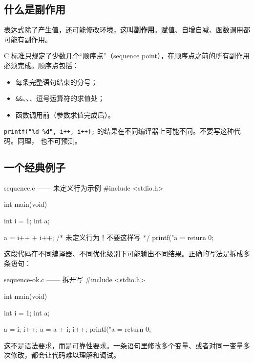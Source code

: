 \subsection{什么是副作用}

表达式除了产生值，还可能修改环境，这叫\textbf{副作用}。赋值、自增自减、函数调用都可能有副作用。

C 标准只规定了少数几个“顺序点”（sequence point），在顺序点之前的所有副作用必须完成。顺序点包括：

\begin{itemize}
  \item 每条完整语句结束的分号；
  \item \texttt{\&\&}、\code{||}、、逗号运算符的求值处；
  \item 函数调用前（参数求值完成后）。
\end{itemize}

\begin{pitfall}[函数参数的求值顺序不确定]
\texttt{printf("\%d \%d", i++, i++);} 的结果在不同编译器上可能不同。不要写这种代码。同理， 也不可预测。
\end{pitfall}

\subsection{一个经典例子}

\begin{codebox}{sequence.c —— 未定义行为示例}
#include <stdio.h>

int main(void)
{
    int i = 1;
    int a;

    a = i++ + i++;      /* 未定义行为！不要这样写 */
    printf("a = %
    return 0;
}
\end{codebox}

这段代码在不同编译器、不同优化级别下可能输出不同结果。正确的写法是拆成多条语句：

\begin{codebox}{sequence-ok.c —— 拆开写}
#include <stdio.h>

int main(void)
{
    int i = 1;
    int a;

    a = i;
    i++;
    a = a + i;
    i++;
    printf("a = %
    return 0;
}
\end{codebox}

\begin{tipbox}[一条语句只做一件事]
这不是语法要求，而是可靠性要求。一条语句里修改多个变量、或者对同一变量多次修改，都会让代码难以理解和调试。
\end{tipbox}

